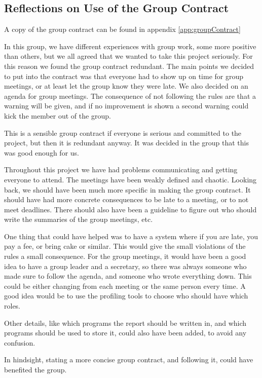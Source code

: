 

\subsection{Reflections on Use of the Group Contract}

A copy of the group contract can be found in appendix \ref{app:groupContract}

In this group, we have different experiences with group work, some more positive than others, but we all agreed that we wanted to take this project seriously. For this reason we found the group contract redundant. 
The main points we decided to put into the contract was that everyone had to show up on time for group meetings, or at least let the group know they were late. We also decided on an agenda for group meetings. The consequence of not following the rules are that a warning will be given, and if no improvement is shown a second warning could kick the member out of the group. 

This is a sensible group contract if everyone is serious and committed to the project, but then it is redundant anyway. It was decided in the group that this was good enough for us. 

Throughout this project we have had problems communicating and getting everyone to attend. The meetings have been weakly defined and chaotic. 
Looking back, we should have been much more specific in making the group contract. It should have had more concrete consequences to be late to a meeting, or to not meet deadlines. There should also have been a guideline to figure out who should write the summaries of the group meetings, etc. 

One thing that could have helped was to have a system where if you are late, you pay a fee, or bring cake or similar. This would give the small violations of the rules a small consequence. 
For the group meetings, it would have been a good idea to have a group leader and a secretary, so there was always someone who made sure to follow the agenda, and someone who wrote everything down. This could be either changing from each meeting or the same person every time. A good idea would be to use the profiling tools to choose who should have which roles. 

Other details, like which programs the report should be written in, and which programs should be used to store it, could also have been added, to avoid any confusion. 

In hindsight, stating a more concise group contract, and following it, could have benefited the group.